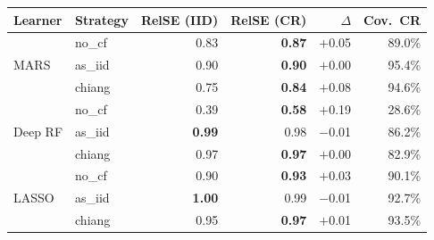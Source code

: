 \begin{tabular}{llrrrr}
\toprule
\textbf{Learner} & \textbf{Strategy} & \textbf{RelSE (IID)} & \textbf{RelSE (CR)} & \textbf{$\Delta$} & \textbf{Cov.\ CR} \\
\midrule
  \multirow{3}{*}{MARS} & no\_cf & 0.83 & \textbf{0.87} & $+$0.05 & 89.0\% \\
   & as\_iid & 0.90 & \textbf{0.90} & $+$0.00 & 95.4\% \\
   & chiang & 0.75 & \textbf{0.84} & $+$0.08 & 94.6\% \\
\midrule
  \multirow{3}{*}{Deep RF} & no\_cf & 0.39 & \textbf{0.58} & $+$0.19 & 28.6\% \\
   & as\_iid & \textbf{0.99} & 0.98 & $-$0.01 & 86.2\% \\
   & chiang & 0.97 & \textbf{0.97} & $+$0.00 & 82.9\% \\
\midrule
  \multirow{3}{*}{LASSO} & no\_cf & 0.90 & \textbf{0.93} & $+$0.03 & 90.1\% \\
   & as\_iid & \textbf{1.00} & 0.99 & $-$0.01 & 92.7\% \\
   & chiang & 0.95 & \textbf{0.97} & $+$0.01 & 93.5\% \\
\bottomrule
\end{tabular}